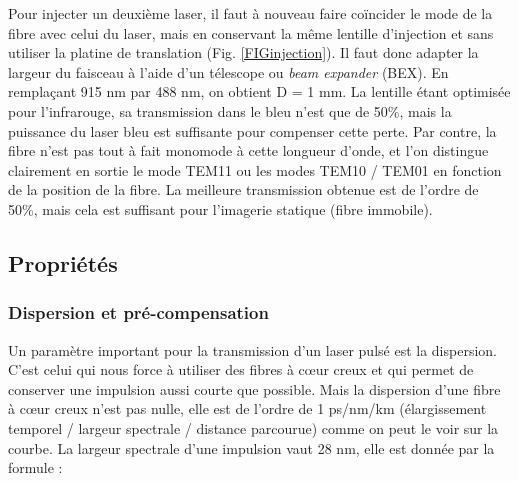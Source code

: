 Pour injecter un deuxième laser, il faut à nouveau faire coïncider le mode de la fibre avec celui du laser, mais en conservant la même lentille d'injection et sans utiliser la platine de translation (Fig. \ref{FIGinjection}). Il faut donc adapter la largeur du faisceau à l'aide d'un télescope ou \emph{beam expander} (BEX). En remplaçant 915 nm par 488 nm, on obtient D = 1 mm. La lentille étant optimisée pour l'infrarouge, sa transmission dans le bleu n'est que de 50\%, mais la puissance du laser bleu est suffisante pour compenser cette perte. Par contre, la fibre n'est pas tout à fait monomode à cette longueur d'onde, et l'on distingue clairement en sortie le mode TEM11 ou les modes TEM10 / TEM01 en fonction de la position de la fibre. La meilleure transmission obtenue est de l'ordre de 50\%, mais cela est suffisant pour l'imagerie statique (fibre immobile).


 



\subsection{Propriétés}


\subsubsection{Dispersion et pré-compensation}

Un paramètre important pour la transmission d'un laser pulsé est la dispersion. C'est celui qui nous force à utiliser des fibres à cœur creux et qui permet de conserver une impulsion aussi courte que possible. Mais la dispersion d'une fibre à cœur creux n'est pas nulle, elle est de l'ordre de 1 ps/nm/km (élargissement temporel / largeur spectrale / distance parcourue) comme on peut le voir sur la courbe. La largeur spectrale d'une impulsion vaut 28 nm, elle est donnée par la formule :


